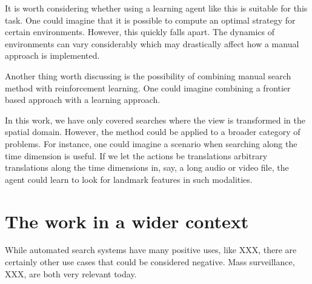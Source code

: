 It is worth considering whether using a learning agent like this is suitable for this task.
One could imagine that it is possible to compute an optimal strategy for certain environments.
However, this quickly falls apart.
The dynamics of environments can vary considerably which may drastically affect how a manual approach is implemented.

Another thing worth discussing is the possibility of combining manual search method with reinforcement learning. One could imagine combining a frontier based approach with a learning approach.


In this work, we have only covered searches where the view is transformed in the spatial domain.
However, the method could be applied to a broader category of problems.
For instance, one could imagine a scenario when searching along the time dimension is useful.
If we let the actions be translations arbitrary translations along the time dimensions in, say, a long audio or video file,
the agent could learn to look for landmark features in such modalities.





\section{The work in a wider context}
\label{sec:work-wider-context}

% 


While automated search systems have many positive uses, like XXX, there are certainly other use cases that could be considered negative.
Mass surveillance, XXX, are both very relevant today.